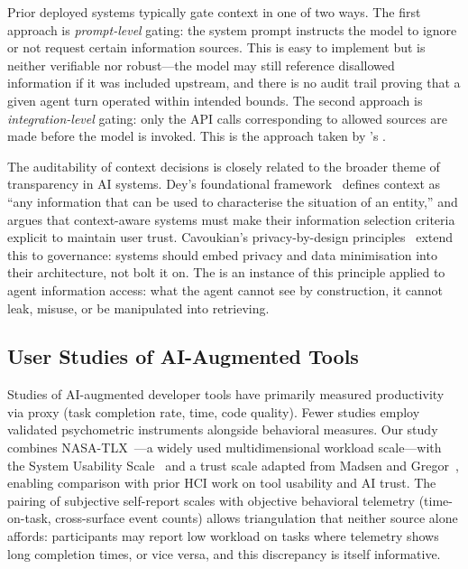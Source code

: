 Prior deployed systems typically gate context in one of two ways. The first
approach is \emph{prompt-level} gating: the system prompt instructs the model
to ignore or not request certain information sources. This is easy to implement
but is neither verifiable nor robust---the model may still reference disallowed
information if it was included upstream, and there is no audit trail proving
that a given agent turn operated within intended bounds. The second approach is
\emph{integration-level} gating: only the API calls corresponding to allowed
sources are made before the model is invoked. This is the approach taken by
\Weld's \ContextGate.

The auditability of context decisions is closely related to the broader theme
of transparency in AI systems. Dey's foundational framework~\cite{dey2001context}
defines context as ``any information that can be used to characterise the
situation of an entity,'' and argues that context-aware systems must make their
information selection criteria explicit to maintain user trust. Cavoukian's
privacy-by-design principles~\cite{cavoukian2009privacybydesign} extend this to
governance: systems should embed privacy and data minimisation into their
architecture, not bolt it on. The \ContextGate is an instance of this principle
applied to agent information access: what the agent cannot see by construction,
it cannot leak, misuse, or be manipulated into retrieving.

\subsection{User Studies of AI-Augmented Tools}
\label{sec:related:userstudies}

Studies of AI-augmented developer tools have primarily measured productivity via
proxy (task completion rate, time, code quality). Fewer studies employ validated
psychometric instruments alongside behavioral measures. Our study combines
NASA-TLX~\cite{hart1988tlx}---a widely used multidimensional workload
scale---with the System Usability Scale~\cite{brooke1996sus} and a trust
scale adapted from Madsen and Gregor~\cite{madsen2000measuring}, enabling
comparison with prior HCI work on tool usability and AI trust. The pairing of
subjective self-report scales with objective behavioral telemetry (time-on-task,
cross-surface event counts) allows triangulation that neither source alone
affords: participants may report low workload on tasks where telemetry shows
long completion times, or vice versa, and this discrepancy is itself
informative.
